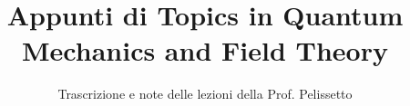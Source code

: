 \documentclass[a4paper,12pt]{article}
\title{Appunti di Topics in Quantum Mechanics and Field Theory}
\author{Trascrizione e note delle lezioni della Prof. Pelissetto}
\date{}
\begin{document}
\maketitle
\projectintro
\tableofcontents
\newpage

\end{document}
